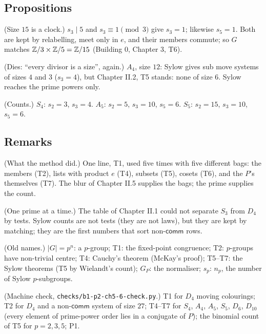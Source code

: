 \subsection*{Propositions}

\begin{lines}
\item[\lab{P1}] (Size $15$ is a clock.) $s_3 \mid 5$ and $s_3 \equiv 1 \pmod 3$ give $s_3 = 1$; likewise $s_5 = 1$. Both are kept by relabelling, meet only in $e$, and their members commute; so $G$ matches $\mathbb{Z}/3 \times \mathbb{Z}/5 = \mathbb{Z}/15$ (Building 0, Chapter 3, T6).
\item[\lab{P2}] (Dies: ``every divisor is a size'', again.) $A_4$, size $12$: Sylow gives sub move systems of sizes $4$ and $3$ ($s_3 = 4$), but Chapter II.2, T5 stands: none of size $6$. Sylow reaches the prime powers only.
\item[\lab{P3}] (Counts.) $S_4$: $s_2 = 3$, $s_3 = 4$. $A_5$: $s_2 = 5$, $s_3 = 10$, $s_5 = 6$. $S_5$: $s_2 = 15$, $s_3 = 10$, $s_5 = 6$.
\end{lines}

\subsection*{Remarks}

\begin{lines}
\item[\lab{R1}] (What the method did.) One line, T1, used five times with five different bags: the members (T2), lists with product $e$ (T4), subsets (T5), cosets (T6), and the $P$'s themselves (T7). The blur of Chapter II.5 supplies the bags; the prime supplies the count.
\item[\lab{R2}] (One prime at a time.) The table of Chapter II.1 could not separate $S_3$ from $D_4$ by tests. Sylow counts are not tests (they are not laws), but they are kept by matching; they are the first numbers that sort non-$\mathsf{comm}$ rows.
\item[\lab{R3}] (Old names.) $|G| = p^n$: a $p$-group; T1: the fixed-point congruence; T2: $p$-groups have non-trivial centre; T4: Cauchy's theorem (McKay's proof); T5--T7: the Sylow theorems (T5 by Wielandt's count); $G_P$: the normaliser; $s_p$: $n_p$, the number of Sylow $p$-subgroups.
\item[\lab{R4}] (Machine check, \texttt{checks/b1-p2-ch5-6-check.py}.) T1 for $D_4$ moving colourings; T2 for $D_4$ and a non-$\mathsf{comm}$ system of size $27$; T4--T7 for $S_4$, $A_4$, $A_5$, $S_5$, $D_6$, $D_{10}$ (every element of prime-power order lies in a conjugate of $P$); the binomial count of T5 for $p = 2, 3, 5$; P1.
\end{lines}

